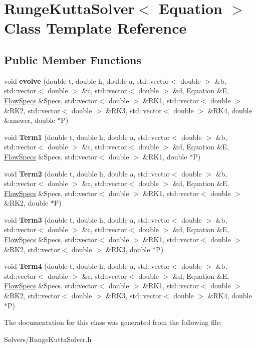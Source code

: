 \hypertarget{classRungeKuttaSolver}{}\section{Runge\+Kutta\+Solver$<$ Equation $>$ Class Template Reference}
\label{classRungeKuttaSolver}
\subsection*{Public Member Functions}
\begin{DoxyCompactItemize}
\item 
\mbox{\label{classRungeKuttaSolver_a37329634fc26021524e17eefe7a4cc6a}} 
void {\bfseries evolve} (double t, double h, double a, std\+::vector$<$ double $>$ \&b, std\+::vector$<$ double $>$ \&c, std\+::vector$<$ double $>$ \&d, Equation \&E, \hyperlink{structFlowSpecs}{Flow\+Specs} \&Specs, std\+::vector$<$ double $>$ \&R\+K1, std\+::vector$<$ double $>$ \&R\+K2, std\+::vector$<$ double $>$ \&R\+K3, std\+::vector$<$ double $>$ \&R\+K4, double \&answer, double $\ast$P)
\item 
\mbox{\label{classRungeKuttaSolver_a11923471753dd8b51f9409cc516c31c4}} 
void {\bfseries Term1} (double t, double h, double a, std\+::vector$<$ double $>$ \&b, std\+::vector$<$ double $>$ \&c, std\+::vector$<$ double $>$ \&d, Equation \&E, \hyperlink{structFlowSpecs}{Flow\+Specs} \&Specs, std\+::vector$<$ double $>$ \&R\+K1, double $\ast$P)
\item 
\mbox{\label{classRungeKuttaSolver_a4b181a5f05a9588c82bd13953a37ed34}} 
void {\bfseries Term2} (double t, double h, double a, std\+::vector$<$ double $>$ \&b, std\+::vector$<$ double $>$ \&c, std\+::vector$<$ double $>$ \&d, Equation \&E, \hyperlink{structFlowSpecs}{Flow\+Specs} \&Specs, std\+::vector$<$ double $>$ \&R\+K1, std\+::vector$<$ double $>$ \&R\+K2, double $\ast$P)
\item 
\mbox{\label{classRungeKuttaSolver_a36736a243e10648fd102b0aca470a650}} 
void {\bfseries Term3} (double t, double h, double a, std\+::vector$<$ double $>$ \&b, std\+::vector$<$ double $>$ \&c, std\+::vector$<$ double $>$ \&d, Equation \&E, \hyperlink{structFlowSpecs}{Flow\+Specs} \&Specs, std\+::vector$<$ double $>$ \&R\+K1, std\+::vector$<$ double $>$ \&R\+K2, std\+::vector$<$ double $>$ \&R\+K3, double $\ast$P)
\item 
\mbox{\label{classRungeKuttaSolver_a0b7ed0612099229e89bfddfea0c3cceb}} 
void {\bfseries Term4} (double t, double h, double a, std\+::vector$<$ double $>$ \&b, std\+::vector$<$ double $>$ \&c, std\+::vector$<$ double $>$ \&d, Equation \&E, \hyperlink{structFlowSpecs}{Flow\+Specs} \&Specs, std\+::vector$<$ double $>$ \&R\+K1, std\+::vector$<$ double $>$ \&R\+K2, std\+::vector$<$ double $>$ \&R\+K3, std\+::vector$<$ double $>$ \&R\+K4, double $\ast$P)
\end{DoxyCompactItemize}


The documentation for this class was generated from the following file\+:\begin{DoxyCompactItemize}
\item 
Solvers/Runge\+Kutta\+Solver.\+h\end{DoxyCompactItemize}
